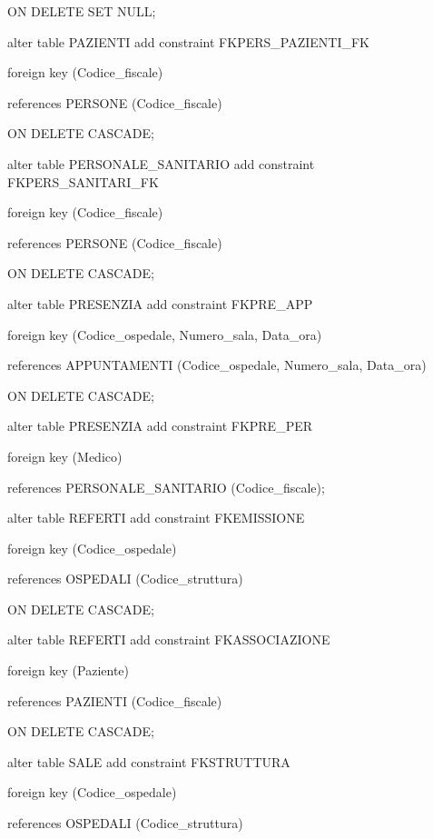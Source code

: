 \documentclass[a4paper,12pt]{report}
\begin{document}
     ON DELETE SET NULL; \newline

\noindent alter table PAZIENTI add constraint FKPERS\_PAZIENTI\_FK

     foreign key (Codice\_fiscale)

     references PERSONE (Codice\_fiscale)

     ON DELETE CASCADE; \newline 

\noindent alter table PERSONALE\_SANITARIO add constraint FKPERS\_SANITARI\_FK

     foreign key (Codice\_fiscale)

     references PERSONE (Codice\_fiscale)

     ON DELETE CASCADE; \newline

\noindent alter table PRESENZIA add constraint FKPRE\_APP

     foreign key (Codice\_ospedale, Numero\_sala, Data\_ora)

     references APPUNTAMENTI (Codice\_ospedale, Numero\_sala, Data\_ora)

     ON DELETE CASCADE; \newline

\noindent alter table PRESENZIA add constraint FKPRE\_PER

     foreign key (Medico)

     references PERSONALE\_SANITARIO (Codice\_fiscale); \newline

\noindent alter table REFERTI add constraint FKEMISSIONE

     foreign key (Codice\_ospedale)

     references OSPEDALI (Codice\_struttura)

     ON DELETE CASCADE; \newline

\noindent alter table REFERTI add constraint FKASSOCIAZIONE

     foreign key (Paziente)

     references PAZIENTI (Codice\_fiscale)

     ON DELETE CASCADE; \newline

\noindent alter table SALE add constraint FKSTRUTTURA

     foreign key (Codice\_ospedale)

     references OSPEDALI (Codice\_struttura)
\end{document}

